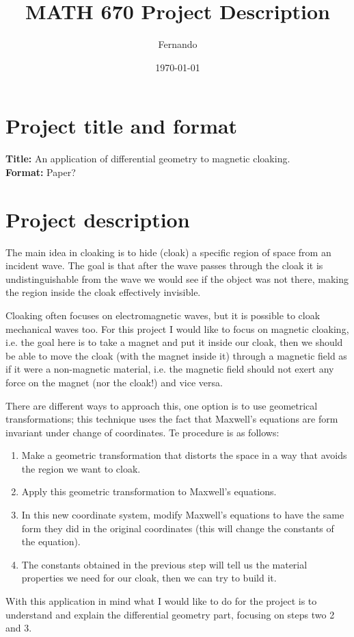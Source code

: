 \documentclass{article}
\begin{document}
\newcommand{\R}{\mathbb{R}}

\title{MATH 670 Project Description}
\author{Fernando}
\date{\today}
\maketitle

\section*{Project title and format}

\textbf{Title:} An application of differential geometry to magnetic cloaking.\\
\textbf{Format:} Paper?

\section*{Project description}

The main idea in cloaking is to hide (cloak) a specific region of space from an
incident wave. The goal is that after the wave passes through the cloak it is
undistinguishable from the wave we would see if the object was not there,
making the region inside the cloak effectively invisible.

Cloaking often focuses on electromagnetic waves, but it is possible to cloak
mechanical waves too. For this project I would like to focus on magnetic
cloaking, i.e. the goal here is to take a magnet and put it inside our cloak,
then we should be able to move the cloak (with the magnet inside it) through a
magnetic field as if it were a non-magnetic material, i.e. the magnetic field
should not exert any force on the magnet (nor the cloak!) and vice versa.

There are different ways to approach this, one option is to use geometrical
transformations; this technique uses the fact that Maxwell's equations are form
invariant under change of coordinates. Te procedure is as follows:
\begin{enumerate}
\item

Make a geometric transformation that distorts the space in a way that avoids
the region we want to cloak.

\item

Apply this geometric transformation to Maxwell's equations.

\item

In this new coordinate system, modify Maxwell's equations to have the same
form they did in the original coordinates (this will change the constants of
the equation).

\item

The constants obtained in the previous step will tell us the material
properties we need for our cloak, then we can try to build it.

\end{enumerate}


With this application in mind what I would like to do for the project is to
understand and explain the differential geometry part, focusing on steps two 2
and 3.
\cite{ward96}

\end{document}
